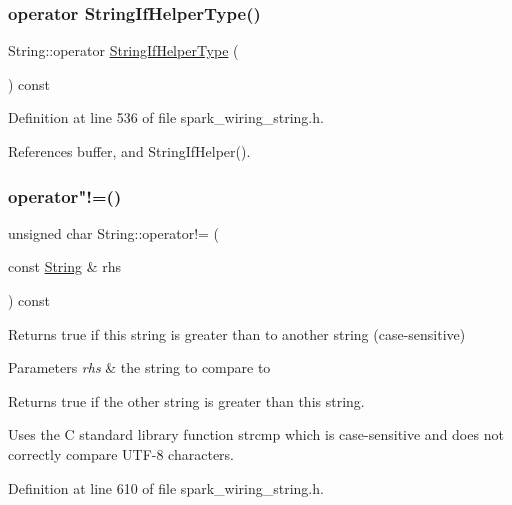 \subsubsection{\texorpdfstring{operator String\+If\+Helper\+Type()}{operator StringIfHelperType()}}
{\footnotesize\ttfamily String\+::operator \hyperlink{class_string_a2f31c4cd9dab650141b50a8350a1ffd4}{String\+If\+Helper\+Type} (\begin{DoxyParamCaption}{ }\end{DoxyParamCaption}) const\hspace{0.3cm}{\ttfamily [inline]}}



Definition at line 536 of file spark\+\_\+wiring\+\_\+string.\+h.



References buffer, and String\+If\+Helper().

\mbox{\label{class_string_a4eda494a17ada57b9e8975c5b44b5227}} 
\subsubsection{\texorpdfstring{operator"!=()}{operator!=()}\hspace{0.1cm}{\footnotesize\ttfamily [1/2]}}
{\footnotesize\ttfamily unsigned char String\+::operator!= (\begin{DoxyParamCaption}\item[{const \hyperlink{class_string}{String} \&}]{rhs }\end{DoxyParamCaption}) const\hspace{0.3cm}{\ttfamily [inline]}}



Returns true if this string is greater than to another string (case-\/sensitive) 


\begin{DoxyParams}{Parameters}
{\em rhs} & the string to compare to\\
\hline
\end{DoxyParams}
\begin{DoxyReturn}{Returns}
true if the other string is greater than this string.
\end{DoxyReturn}
Uses the C standard library function strcmp which is case-\/sensitive and does not correctly compare U\+T\+F-\/8 characters. 

Definition at line 610 of file spark\+\_\+wiring\+\_\+string.\+h.




